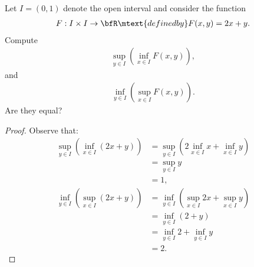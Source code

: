 \documentclass[10pt,twoside,openany]{memoir}
\begin{document}
    \begin{exercise}
        Let $I = (0,1)$ denote the open interval and consider the function
            \begin{equation*}
            \begin{split}
                F:I \times I \rightarrow \bfR \mtext{defined by} F(x,y) = 2x + y.
            \end{split}
            \end{equation*}
        Compute
            \begin{equation*}
            \begin{split}
                \sup_{y \in I} \left(\inf_{x \in I} F(x,y)\right),
            \end{split}
            \end{equation*}
        and
            \begin{equation*}
            \begin{split}
                \inf_{y \in I} \left(\sup_{x \in I} F(x,y)\right).
            \end{split}
            \end{equation*}
        Are they equal?
    \end{exercise}
        \begin{proof}
            Observe that:
                \begin{equation*}
                \begin{split}
                    \sup_{y \in I}\left(\inf_{x \in I}(2x+y)\right)
                    & = \sup_{y \in I}\left(2\inf_{x \in I}x+\inf_{x \in I}y\right) \\
                    & = \sup_{y \in I}y \\
                    & = 1,
                \end{split}
                \end{equation*}
                \begin{equation*}
                \begin{split}
                    \inf_{y \in I}\left(\sup_{x \in I}(2x+y)\right)
                    & = \inf_{y \in I} \left( \sup_{x \in I}2x + \sup_{x \in I}y\right) \\
                    & = \inf_{y \in I} \left( 2 + y\right) \\
                    & = \inf_{y \in I}2 + \inf_{y \in I}y \\
                    & = 2.
                \end{split}
                \end{equation*}
        \end{proof}
\end{document}
